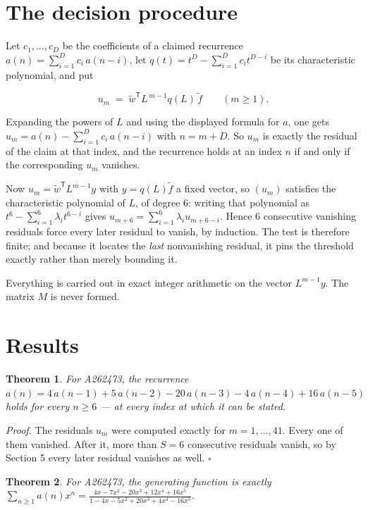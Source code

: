\documentclass[11pt]{article}
\newtheorem{theorem}{Theorem}
\theoremstyle{definition}
\begin{document}
\section{The decision procedure}

Let $c_1,\dots,c_D$ be the coefficients of a claimed recurrence $a(n) = \sum_{i=1}^{D} c_i\,a(n-i)$, let $q(t) = t^{D} - \sum_{i=1}^{D} c_i t^{D-i}$ be its characteristic polynomial, and put

\[u_m \;=\; \tilde w^{\mathsf T} L^{\,m-1} q(L)\,\tilde f \qquad (m \ge 1).\]

Expanding the powers of $L$ and using the displayed formula for $a$, one gets $u_m = a(n) - \sum_{i=1}^{D} c_i\,a(n-i)$ with $n = m + D$. So $u_m$ is exactly the residual of the claim at that index, and the recurrence holds at an index $n$ if and only if the corresponding $u_m$ vanishes.

Now $u_m = \tilde w^{\mathsf T} L^{m-1} y$ with $y = q(L)\tilde f$ a fixed vector, so $(u_m)$ satisfies the characteristic polynomial of $L$, of degree $6$: writing that polynomial as $t^{6} - \sum_{i=1}^{6} \lambda_i t^{6-i}$ gives $u_{m+6} = \sum_{i=1}^{6} \lambda_i u_{m+6-i}$. Hence $6$ consecutive vanishing residuals force every later residual to vanish, by induction. The test is therefore finite; and because it locates the {\itshape last} nonvanishing residual, it pins the threshold exactly rather than merely bounding it.

Everything is carried out in exact integer arithmetic on the vector $L^{m-1}y$. The matrix $M$ is never formed.

\section{Results}

\begin{theorem} For A262473, the recurrence $a(n) = 4\,a(n-1) + 5\,a(n-2) - 20\,a(n-3) - 4\,a(n-4) + 16\,a(n-5)$ holds for every $n \ge 6$ --- at every index at which it can be stated.\end{theorem}

{\itshape Proof.} The residuals $u_m$ were computed exactly for $m = 1,\dots,41$. Every one of them vanished. After it, more than $S = 6$ consecutive residuals vanish, so by Section 5 every later residual vanishes as well. $\square$

\begin{theorem} For A262473, the generating function is exactly $\sum_{n\ge 1} a(n)x^n = \frac{4x - 7x^{2} - 20x^{3} + 12x^{4} + 16x^{5}}{1 - 4x - 5x^{2} + 20x^{3} + 4x^{4} - 16x^{5}}$.\end{theorem}
\end{document}
